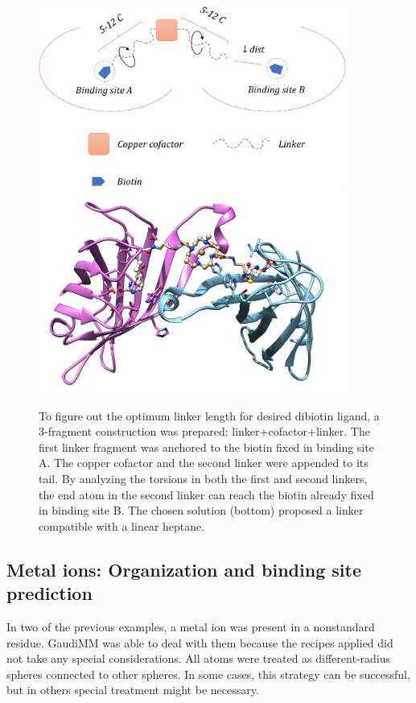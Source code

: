 \begin{figure}
	\begin{Center}
		\includegraphics[width=0.9\textwidth]{./figures/06/dibiotin-scheme-crop.pdf} \\
		\includegraphics[width=0.9\textwidth]{./figures/06/dibiotin-solution.png}
	\end{Center}
	\caption[Linker length optimization]{To figure out the optimum linker length for  desired dibiotin ligand, a 3-fragment construction was prepared: linker+cofactor+linker. The first linker fragment was anchored to the biotin fixed in binding site A. The copper cofactor and the second linker were appended to its tail. By analyzing the torsions in both the first and second linkers, the end atom in the second linker can reach the biotin already fixed in binding site B. The chosen solution (bottom) proposed a linker compatible with a linear heptane.}
	\label{fig:dibiotin-linker-length}
\end{figure}


\subsection{Metal ions: Organization and binding site prediction}
\label{section:metal-applications}
In two of the previous examples, a metal ion was present in a nonstandard residue. GaudiMM was able to deal with them because the recipes applied did not take any special considerations. All atoms were treated as different-radius spheres connected to other spheres. In some cases, this strategy can be successful, but in others special treatment might be necessary.

